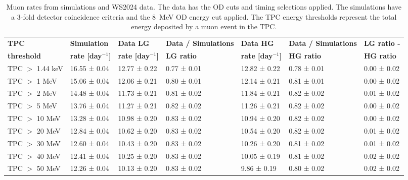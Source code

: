 \begin{landscape}
\begin{table}[ht!]
\begin{tabular}{lllllll}
    \hline\hline
    \end{tabular}
    \label{tab:Muons/Rates2022}
\end{table}
\begin{table}[ht!]
    \centering
    \caption[Muon rates from simulations and WS2024 data.]{Muon rates from simulations and WS2024 data. The data has the OD cuts and timing selections applied. The simulations have a 3-fold detector coincidence criteria and the 8~MeV OD energy cut applied. The TPC energy thresholds represent the total energy deposited by a muon event in the TPC.}
    \begin{tabular}{lllllll}
    \hline\hline
    \textbf{TPC} & \textbf{Simulation} & \textbf{Data LG} & \textbf{Data / Simulations} & \textbf{Data HG} & \textbf{Data / Simulations} & \textbf{LG ratio -} \\
    \textbf{threshold} & \textbf{rate [day$^{-1}$]} & \textbf{rate [day$^{-1}$]} & \textbf{LG ratio} & \textbf{rate [day$^{-1}$]} & \textbf{HG ratio} & \textbf{HG ratio} \\
    \hline
    TPC $>$ 1.44 keV & 16.55 ± 0.04 & 12.77 ± 0.22 & 0.77 ± 0.01  & 12.82 ± 0.22 & 0.78 ± 0.01  &0.00 ± 0.02 \\ 
    TPC $>$ 1 MeV & 15.06 ± 0.04 & 12.06 ± 0.21 & 0.80 ± 0.01  & 12.14 ± 0.21 & 0.81 ± 0.01  &0.00 ± 0.02 \\ 
    TPC $>$ 2 MeV & 14.48 ± 0.04 & 11.73 ± 0.21 & 0.81 ± 0.02  & 11.84 ± 0.21 & 0.82 ± 0.02  &0.01 ± 0.02 \\ 
    TPC $>$ 5 MeV & 13.76 ± 0.04 & 11.27 ± 0.21 & 0.82 ± 0.02  & 11.26 ± 0.21 & 0.82 ± 0.02  &0.00 ± 0.02 \\ 
    TPC $>$ 10 MeV & 13.28 ± 0.04 & 10.98 ± 0.20 & 0.83 ± 0.02  & 10.94 ± 0.20 & 0.82 ± 0.02  &0.00 ± 0.02 \\ 
    TPC $>$ 20 MeV & 12.84 ± 0.04 & 10.62 ± 0.20 & 0.83 ± 0.02  & 10.54 ± 0.20 & 0.82 ± 0.02  &0.01 ± 0.02 \\ 
    TPC $>$ 30 MeV & 12.60 ± 0.04 & 10.43 ± 0.20 & 0.83 ± 0.02  & 10.26 ± 0.20 & 0.81 ± 0.02  &0.01 ± 0.02 \\ 
    TPC $>$ 40 MeV & 12.41 ± 0.04 & 10.25 ± 0.20 & 0.83 ± 0.02  & 10.05 ± 0.19 & 0.81 ± 0.02  &0.02 ± 0.02 \\ 
    TPC $>$ 50 MeV & 12.26 ± 0.04 & 10.13 ± 0.20 & 0.83 ± 0.02  &  9.86 ± 0.19 & 0.80 ± 0.02  &0.02 ± 0.02 \\
    \hline\hline
    \end{tabular}
    \label{tab:Muons/Rates2024}
\end{table}
\end{landscape}